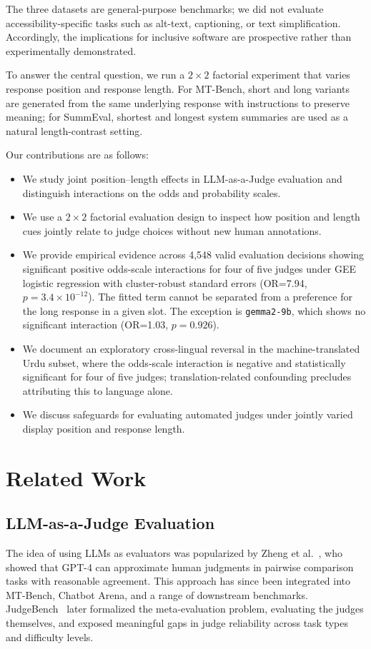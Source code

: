 \documentclass[10pt,conference]{IEEEtran}
\begin{document}
The three datasets are general-purpose benchmarks; we did not evaluate accessibility-specific tasks such as alt-text, captioning, or text simplification. Accordingly, the implications for inclusive software are prospective rather than experimentally demonstrated.

To answer the central question, we run a $2\times2$ factorial experiment that varies response position and response length. For MT-Bench, short and long variants are generated from the same underlying response with instructions to preserve meaning; for SummEval, shortest and longest system summaries are used as a natural length-contrast setting.

Our contributions are as follows:
\begin{itemize}
\item We study joint position--length effects in LLM-as-a-Judge evaluation and distinguish interactions on the odds and probability scales.
\item We use a $2\times2$ factorial evaluation design to inspect how position and length cues jointly relate to judge choices without new human annotations.
\item We provide empirical evidence across 4,548 valid evaluation decisions showing significant positive odds-scale interactions for four of five judges under GEE logistic regression with cluster-robust standard errors (OR=7.94, $p=3.4\times10^{-12}$). The fitted term cannot be separated from a preference for the long response in a given slot. The exception is \texttt{gemma2-9b}, which shows no significant interaction (OR=1.03, $p=0.926$).
\item We document an exploratory cross-lingual reversal in the machine-translated Urdu subset, where the odds-scale interaction is negative and statistically significant for four of five judges; translation-related confounding precludes attributing this to language alone.
\item We discuss safeguards for evaluating automated judges under jointly varied display position and response length.
\end{itemize}

\section{Related Work}
\subsection{LLM-as-a-Judge Evaluation}
The idea of using LLMs as evaluators was popularized by Zheng et al.~\cite{zheng2023judging}, who showed that GPT-4 can approximate human judgments in pairwise comparison tasks with reasonable agreement. This approach has since been integrated into MT-Bench, Chatbot Arena, and a range of downstream benchmarks. JudgeBench~\cite{tan2025judgebench} later formalized the meta-evaluation problem, evaluating the judges themselves, and exposed meaningful gaps in judge reliability across task types and difficulty levels.
\end{document}
